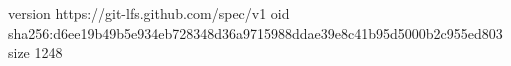 version https://git-lfs.github.com/spec/v1
oid sha256:d6ee19b49b5e934eb728348d36a9715988ddae39e8c41b95d5000b2c955ed803
size 1248
